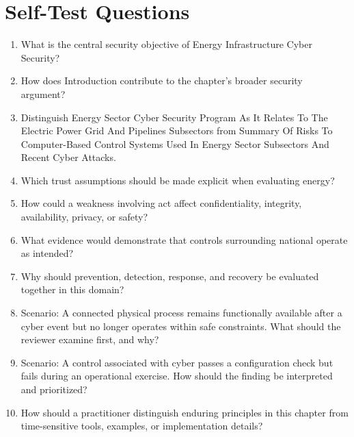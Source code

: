 \documentclass[11pt]{article}
\begin{document}
\section*{Self-Test Questions}
\begin{enumerate}
\item What is the central security objective of Energy Infrastructure Cyber Security?
\item How does Introduction contribute to the chapter's broader security argument?
\item Distinguish Energy Sector Cyber Security Program As It Relates To The Electric Power Grid And Pipelines Subsectors from Summary Of Risks To Computer-Based Control Systems Used In Energy Sector Subsectors And Recent Cyber Attacks.
\item Which trust assumptions should be made explicit when evaluating energy?
\item How could a weakness involving act affect confidentiality, integrity, availability, privacy, or safety?
\item What evidence would demonstrate that controls surrounding national operate as intended?
\item Why should prevention, detection, response, and recovery be evaluated together in this domain?
\item Scenario: A connected physical process remains functionally available after a cyber event but no longer operates within safe constraints. What should the reviewer examine first, and why?
\item Scenario: A control associated with cyber passes a configuration check but fails during an operational exercise. How should the finding be interpreted and prioritized?
\item How should a practitioner distinguish enduring principles in this chapter from time-sensitive tools, examples, or implementation details?
\end{enumerate}
\end{document}
